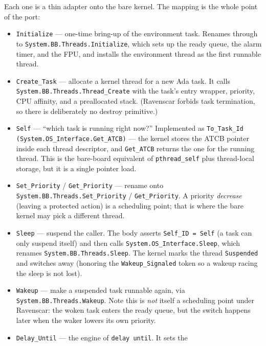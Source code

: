 Each one is a thin adapter onto the bare kernel. The mapping is the whole point
of the port:

\begin{itemize}
  \item \texttt{Initialize} --- one-time bring-up of the environment task.
        Renames through to \texttt{System.BB.Threads.Initialize}, which sets up
        the ready queue, the alarm timer, and the FPU, and installs the
        environment thread as the first runnable thread.
  \item \texttt{Create\_Task} --- allocate a kernel thread for a new Ada task. It
        calls \texttt{System.BB.Threads.Thread\_Create} with the task's entry
        wrapper, priority, CPU affinity, and a preallocated stack. (Ravenscar
        forbids task termination, so there is deliberately no destroy
        primitive.)
  \item \texttt{Self} --- ``which task is running right now?'' Implemented as
        \texttt{To\_Task\_Id (System.OS\_Interface.Get\_ATCB)} --- the kernel
        stores the ATCB pointer inside each thread descriptor, and
        \texttt{Get\_ATCB} returns the one for the running thread. This is the
        bare-board equivalent of \texttt{pthread\_self} plus thread-local
        storage, but it is a single pointer load.
  \item \texttt{Set\_Priority} / \texttt{Get\_Priority} --- rename onto
        \texttt{System.BB.Threads.Set\_Priority} / \texttt{Get\_Priority}. A
        priority \emph{decrease} (leaving a protected action) is a scheduling
        point; that is where the bare kernel may pick a different thread.
  \item \texttt{Sleep} --- suspend the caller. The body asserts
        \texttt{Self\_ID = Self} (a task can only suspend itself) and then calls
        \texttt{System.OS\_Interface.Sleep}, which renames
        \texttt{System.BB.Threads.Sleep}. The kernel marks the thread
        \texttt{Suspended} and switches away (honoring the \texttt{Wakeup\_Signaled}
        token so a wakeup racing the sleep is not lost).
  \item \texttt{Wakeup} --- make a suspended task runnable again, via
        \texttt{System.BB.Threads.Wakeup}. Note this is \emph{not} itself a
        scheduling point under Ravenscar: the woken task enters the ready queue,
        but the switch happens later when the waker lowers its own priority.
  \item \texttt{Delay\_Until} --- the engine of \texttt{delay until}. It sets the

\end{itemize}
